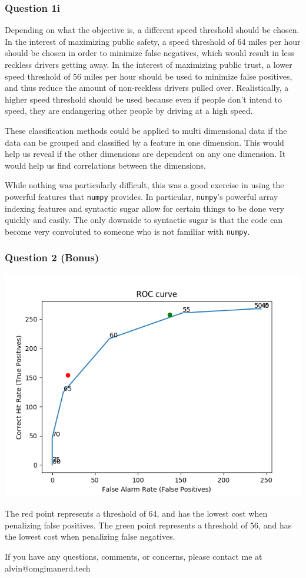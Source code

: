 \documentclass{math}
\begin{document}
\subsubsection*{Question 1i}
Depending on what the objective is, a different speed threshold should be
chosen. In the interest of maximizing public safety, a speed threshold of
64 miles per hour should be chosen in order to minimize false negatives, which
would result in less reckless drivers getting away. In the interest of
maximizing public trust, a lower speed threshold of 56 miles per hour should be
used to minimize false positives, and thus reduce the amount of non-reckless
drivers pulled over. Realistically, a higher speed threshold should be used
because even if people don't intend to speed, they are endangering other people
by driving at a high speed. \par
These classification methods could be applied to multi dimensional data if the
data can be grouped and classified by a feature in one dimension. This would
help us reveal if the other dimensions are dependent on any one dimension. It
would help us find correlations between the dimensions. \par
While nothing was particularly difficult, this was a good exercise in using the
powerful features that \texttt{numpy} provides. In particular, \texttt{numpy}'s
powerful array indexing features and syntactic sugar allow for certain things to
be done very quickly and easily. The only downside to syntactic sugar is that
the code can become very convoluted to someone who is not familiar with
\texttt{numpy}.

\subsubsection*{Question 2 (Bonus)}
\begin{center}
  \includegraphics[width=16cm]{assets/hw_02_roc_curve.png}
\end{center}
The red point represents a threshold of 64, and has the lowest cost when
penalizing false positives. The green point represents a threshold of 56,
and has the lowest cost when penalizing false negatives.

\begin{center}
  If you have any questions, comments, or concerns, please contact me at
  alvin@omgimanerd.tech
\end{center}
\end{document}
